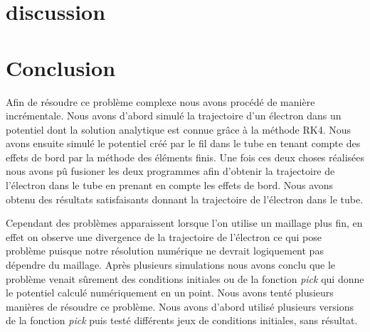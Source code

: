 \documentclass[a4paper,12pt]{article}
\begin{document}


\section{discussion}



\section{Conclusion}
Afin de résoudre ce problème complexe nous avons procédé de manière incrémentale. Nous avons d'abord simulé la trajectoire d'un électron dans un potentiel dont la solution analytique est connue grâce à la méthode RK4. Nous avons ensuite simulé le potentiel créé par le fil dans le tube en tenant compte des effets de bord par la méthode des éléments finis. Une fois ces deux choses réalisées nous avons pû fusioner les deux programmes afin d'obtenir la trajectoire de l'électron dans le tube en prenant en compte les effets de bord.  Nous avons obtenu des résultats satisfaisants donnant la trajectoire de l'électron dans le tube.


Cependant des problèmes apparaissent lorsque l'on utilise un maillage plus fin, en effet on observe une divergence de la trajectoire de l'électron ce qui pose problème puisque notre résolution numérique ne devrait logiquement pas dépendre du maillage. Après plusieurs simulations nous avons conclu que le problème venait sûrement des conditions initiales ou de la fonction \emph{pick} qui donne le potentiel calculé numériquement en un point. Nous avons tenté plusieurs manières de résoudre ce problème. Nous avons d'abord utilisé plusieurs versions de la fonction \emph{pick} puis testé différents jeux de conditions initiales, sans résultat.
\end{document}
